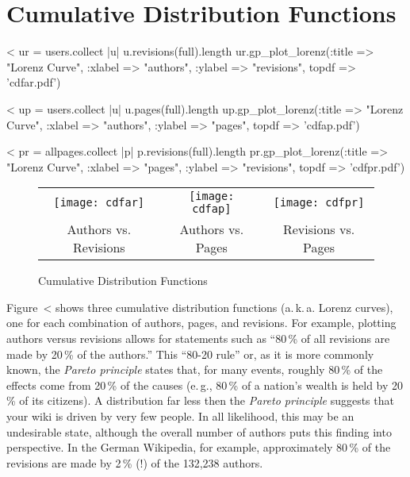\documentclass{scrartcl}
\begin{document}



\section{Cumulative Distribution Functions} %
\label{sec:cumulative_distribution_functions}

<%
ur = users.collect { |u| u.revisions(full).length }
ur.gp_plot_lorenz(:title => "Lorenz Curve", :xlabel => "authors", :ylabel => "revisions", topdf => 'cdfar.pdf')

<%
up = users.collect { |u| u.pages(full).length }
up.gp_plot_lorenz(:title => "Lorenz Curve", :xlabel => "authors", :ylabel => "pages", topdf => 'cdfap.pdf')

<%
pr = allpages.collect { |p| p.revisions(full).length }
pr.gp_plot_lorenz(:title => "Lorenz Curve", :xlabel => "pages", :ylabel => "revisions", topdf => 'cdfpr.pdf')

\begin{figure}
  \centering
  \begin{tabular}{@{}ccc@{}}
    \texttt{[image: cdfar]} &
    \texttt{[image: cdfap]} &
    \texttt{[image: cdfpr]}\\
    Authors vs. Revisions &
    Authors vs. Pages &
    Revisions vs. Pages
  \end{tabular}
  \caption{Cumulative Distribution Functions}
  \label{fig:cumulative_distribution_functions}
\end{figure}

Figure~<%
shows three cumulative distribution functions (a.\,k.\,a. Lorenz curves), one for each combination of authors, pages, and revisions. For example, plotting authors versus revisions allows for statements such as ``80\,\% of all revisions are made by 20\,\% of the authors.'' This ``80-20 rule'' or, as it is more commonly known, the \emph{Pareto principle} states that, for many events, roughly 80\,\% of the effects come from 20\,\% of the causes (e.\,g., 80\,\% of a nation's wealth is held by 20\,\% of its citizens). A distribution far less then the \emph{Pareto principle} suggests that your wiki is driven by very few people. In all likelihood, this may be an undesirable state, although the overall number of authors puts this finding into perspective. In the German Wikipedia, for example, approximately 80\,\% of the revisions are made by 2\,\% (!) of the 132,238 authors.
\end{document}
